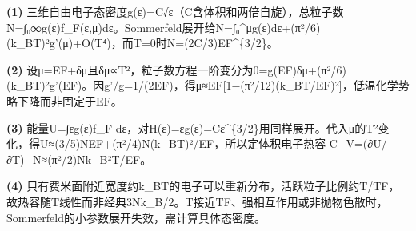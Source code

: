 \par\noindent\textbf{(1)} 三维自由电子态密度g(ε)=C√ε（C含体积和两倍自旋），总粒子数N=∫₀∞g(ε)f\_F(ε,μ)dε。Sommerfeld展开给N=∫₀\textasciicircum{}μg(ε)dε+(π²/6)(k\_BT)²g'(μ)+O(T⁴)，而T=0时N=(2C/3)EF\textasciicircum{}\{3/2\}。
\par\noindent\textbf{(2)} 设μ=EF+δμ且δμ∝T²，粒子数方程一阶变分为0=g(EF)δμ+(π²/6)(k\_BT)²g'(EF)。因g'/g=1/(2EF)，得μ≈EF[1−(π²/12)(k\_BT/EF)²]，低温化学势略下降而非固定于EF。
\par\noindent\textbf{(3)} 能量U=∫εg(ε)f\_F dε，对H(ε)=εg(ε)=Cε\textasciicircum{}\{3/2\}用同样展开。代入μ的T²变化，得U≈(3/5)NEF+(π²/4)N(k\_BT)²/EF，所以定体积电子热容 C\_V=(∂U/∂T)\_N≈(π²/2)Nk\_B²T/EF。
\par\noindent\textbf{(4)} 只有费米面附近宽度约k\_BT的电子可以重新分布，活跃粒子比例约T/TF，故热容随T线性而非经典3Nk\_B/2。T接近TF、强相互作用或非抛物色散时，Sommerfeld的小参数展开失效，需计算具体态密度。

